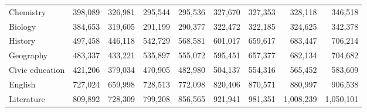 \begin{tabular}{@{}lrrrrrrrr@{}}
Chemistry & 398,089 & 326,981 & 295,544 & 295,536 & 327,670 & 327,353 & 328,118 & 346,518 \\
Biology & 384,653 & 319,605 & 291,199 & 290,377 & 322,472 & 322,185 & 324,625 & 342,378 \\
History & 497,458 & 446,118 & 542,729 & 568,581 & 601,017 & 659,617 & 683,447 & 706,214 \\
Geography & 483,337 & 433,221 & 535,897 & 555,072 & 595,451 & 657,377 & 682,134 & 704,682 \\
Civic education & 421,206 & 379,034 & 470,905 & 482,980 & 504,137 & 554,316 & 565,452 & 583,609 \\
English & 727,024 & 659,998 & 728,513 & 772,098 & 820,406 & 870,571 & 880,997 & 906,538 \\
Literature & 809,892 & 728,309 & 799,208 & 856,565 & 921,941 & 981,351 & 1,008,239 & 1,050,101 \\
\bottomrule
\end{tabular}
